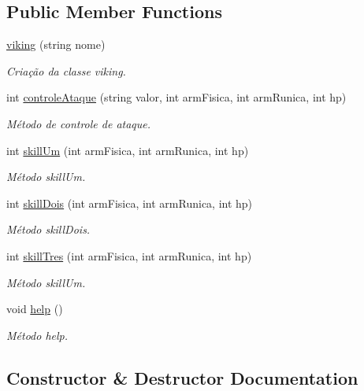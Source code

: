 \subsection*{Public Member Functions}
\begin{DoxyCompactItemize}
\item 
\mbox{\hyperlink{classviking_aec7e94a062284984afac0ffc49ea5213}{viking}} (string nome)
\begin{DoxyCompactList}\small\item\em Criação da classe viking. \end{DoxyCompactList}\item 
int \mbox{\hyperlink{classviking_aba7bbd831d9b38d98b74ca805d2ea250}{controle\+Ataque}} (string valor, int arm\+Fisica, int arm\+Runica, int hp)
\begin{DoxyCompactList}\small\item\em Método de controle de ataque. \end{DoxyCompactList}\item 
int \mbox{\hyperlink{classviking_a433998767ad855cbfa152c1b0f32363e}{skill\+Um}} (int arm\+Fisica, int arm\+Runica, int hp)
\begin{DoxyCompactList}\small\item\em Método skill\+Um. \end{DoxyCompactList}\item 
int \mbox{\hyperlink{classviking_a5d9d645dae5e647b668c57afa0be1cd8}{skill\+Dois}} (int arm\+Fisica, int arm\+Runica, int hp)
\begin{DoxyCompactList}\small\item\em Método skill\+Dois. \end{DoxyCompactList}\item 
int \mbox{\hyperlink{classviking_a68c634c68c727ebd2638965b6d393f42}{skill\+Tres}} (int arm\+Fisica, int arm\+Runica, int hp)
\begin{DoxyCompactList}\small\item\em Método skill\+Um. \end{DoxyCompactList}\item 
void \mbox{\hyperlink{classviking_a486735595f8a0f86a075699bec76c03e}{help}} ()
\begin{DoxyCompactList}\small\item\em Método help. \end{DoxyCompactList}\end{DoxyCompactItemize}


\subsection{Constructor \& Destructor Documentation}
\mbox{\label{classviking_aec7e94a062284984afac0ffc49ea5213}} 
